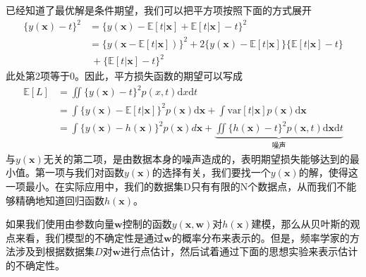 已经知道了最优解是条件期望，我们可以把平方项按照下面的方式展开
\begin{equation}
	\begin{aligned}
		\{y(\boldsymbol{x})-t \}^2&=\{y(\boldsymbol{x})-\mathbb{E}[t|\boldsymbol{x}]+\mathbb{E}[t|\boldsymbol{x}]-t\}^2\\
		&=\{y(\boldsymbol{x}-\mathbb{E}[t|\boldsymbol{x}]) \}^2+2\{y(\boldsymbol{x})-\mathbb{E}[t|\boldsymbol{x}]\}\{\mathbb{E}[t|\boldsymbol{x}]-t\}\\
		&\ +\{\mathbb{E}[t|\boldsymbol{x}]-t\}^2
	\end{aligned}
\end{equation}
此处第2项等于0。因此，平方损失函数的期望可以写成
\begin{equation}
\label{llk}
\begin{aligned}
	\mathbb{E}[L]&=\iint \{y(\boldsymbol{x})-t\}^2p(x,t)\mathrm{d}x\mathrm{d}t\\
	&=\int \{y(\boldsymbol{x})-\mathbb{E}[t|\boldsymbol{x}]\}^2p(\boldsymbol{x})\mathrm{d}\boldsymbol{x}+\int \mathrm{var}[t|\boldsymbol{x}]p(\boldsymbol{x})\mathrm{d}\boldsymbol{x}\\
	&=\int \{y(\boldsymbol{x})-h(\boldsymbol{x}) \}^2p(\boldsymbol{x})d\boldsymbol{x} + \underbrace{\iint \{h(\boldsymbol{x})-t\}^2p(\boldsymbol{x},t)\mathrm{d}\boldsymbol{x}\mathrm{d}t}_{\text{噪声}}
\end{aligned}
\end{equation}
与$y(\boldsymbol{x})$无关的第二项，是由数据本身的噪声造成的，表明期望损失能够达到的最小值。第一项与我们对函数$y(\boldsymbol{x})$的选择有关，我们要找一个$y(\boldsymbol{x})$的解，使得这一项最小。在实际应用中，我们的数据集D只有有限的N个数据点，从而我们不能够精确地知道回归函数$h(\boldsymbol{x})$。

如果我们使用由参数向量$\boldsymbol{w}$控制的函数$y(\boldsymbol{x},\boldsymbol{w})$对$h(\boldsymbol{x})$建模，那么从贝叶斯的观点来看，我们模型的不确定性是通过$\boldsymbol{w}$的概率分布来表示的。但是，频率学家的方法涉及到根据数据集$D$对$\boldsymbol{w}$进行点估计，然后试着通过下面的思想实验来表示估计的不确定性。

